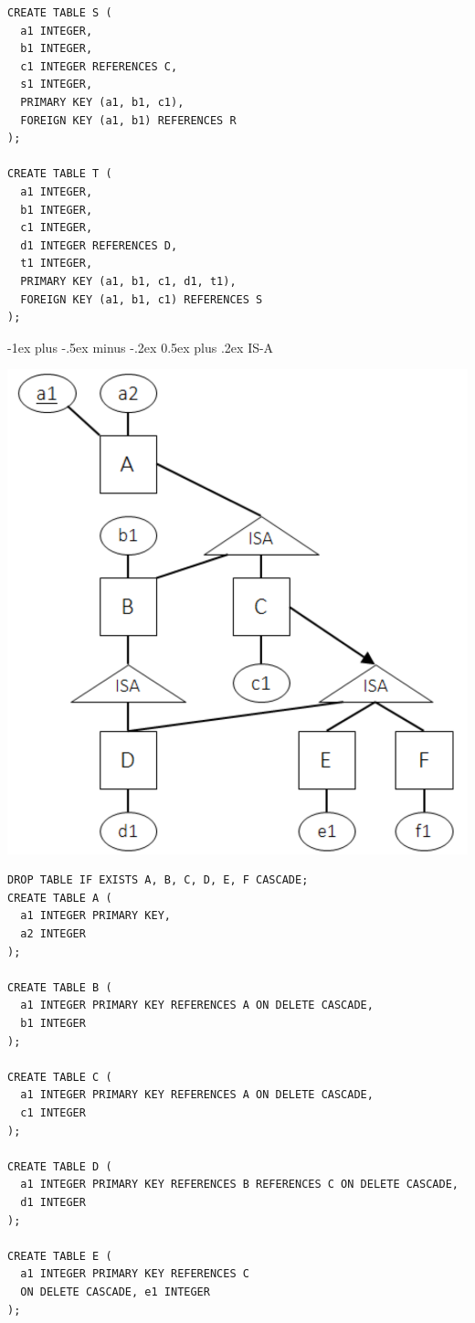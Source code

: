 \documentclass[10pt, landscape]{article}
\makeatletter
\renewcommand{\section}{\@startsection{section}{1}{0mm}%
  {-1ex plus -.5ex minus -.2ex}%
  {0.5ex plus .2ex}%
{\normalfont\large\bfseries}}
\makeatother
\begin{document}
\begin{multicols*}{3}
\begin{lstlisting}[style=mySQL]
CREATE TABLE S ( 
  a1 INTEGER,
  b1 INTEGER,
  c1 INTEGER REFERENCES C,
  s1 INTEGER,
  PRIMARY KEY (a1, b1, c1),
  FOREIGN KEY (a1, b1) REFERENCES R
);

CREATE TABLE T (
  a1 INTEGER,
  b1 INTEGER,
  c1 INTEGER,
  d1 INTEGER REFERENCES D,
  t1 INTEGER,
  PRIMARY KEY (a1, b1, c1, d1, t1), 
  FOREIGN KEY (a1, b1, c1) REFERENCES S
);
  \end{lstlisting}

  \section{IS-A}
  \begin{tightcenter}
    \includegraphics[width=0.8\linewidth]{cs2102-er-model-isa.png} 
  \end{tightcenter}
  \begin{lstlisting}[style=mySQL]
DROP TABLE IF EXISTS A, B, C, D, E, F CASCADE;
CREATE TABLE A (
  a1 INTEGER PRIMARY KEY,
  a2 INTEGER
);

CREATE TABLE B (
  a1 INTEGER PRIMARY KEY REFERENCES A ON DELETE CASCADE,
  b1 INTEGER 
);

CREATE TABLE C (
  a1 INTEGER PRIMARY KEY REFERENCES A ON DELETE CASCADE, 
  c1 INTEGER
);

CREATE TABLE D (
  a1 INTEGER PRIMARY KEY REFERENCES B REFERENCES C ON DELETE CASCADE,
  d1 INTEGER 
);

CREATE TABLE E (
  a1 INTEGER PRIMARY KEY REFERENCES C
  ON DELETE CASCADE, e1 INTEGER
);


\end{lstlisting}
\end{multicols*}
\end{document}
